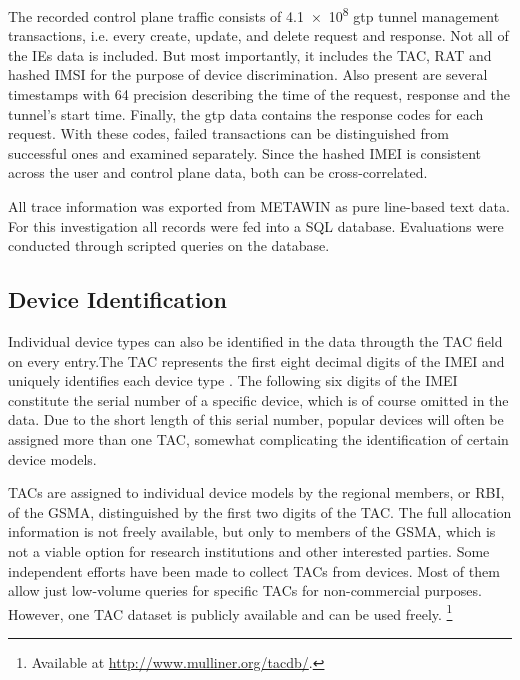 The recorded control plane traffic consists of \num{4.1e8} \gls{gtp} tunnel management transactions, i.e. every create, update, and delete request and response. Not all of the \glspl{IE} data is included. But most importantly, it includes the \gls{TAC}, \gls{RAT} and hashed \gls{IMSI} for the purpose of device discrimination. Also present are several timestamps with \SI{64}{\bit} precision describing the time of the request, response and the tunnel's start time. Finally, the \gls{gtp} data contains the response codes for each request. With these codes, failed transactions can be distinguished from successful ones and examined separately. Since the hashed \gls{IMEI} is consistent across the user and control plane data, both can be cross-correlated.

All trace information was exported from \gls{METAWIN} as pure line-based text data. For this investigation all records were fed into a \acrshort{SQL} database. Evaluations were conducted through scripted queries on the database.  

\subsection{Device Identification}

Individual device types can also be identified in the data througth the \gls{TAC} field on every entry.The \gls{TAC} represents the first eight decimal digits of the \gls{IMEI} and uniquely identifies each device type \cite{3gpp.23.003}. The following six digits of the \gls{IMEI} constitute the serial number of a specific device, which is of course omitted in the data. Due to the short length of this serial number, popular devices will often be assigned more than one \gls{TAC}, somewhat complicating the identification of certain device models.

\glspl{TAC} are assigned to individual device models by the regional members, or \gls{RBI}, of the \gls{GSMA}, distinguished by the first two digits of the \gls{TAC}. The full allocation information is not freely available, but only to members of the \gls{GSMA}, which is not a viable option for research institutions and other interested parties. Some independent efforts have been made to collect \glspl{TAC} from devices. Most of them allow just low-volume queries for specific \glspl{TAC} for non-commercial purposes. However, one \gls{TAC} dataset is publicly available and can be used freely. \footnote{Available at \url{http://www.mulliner.org/tacdb/}.}

